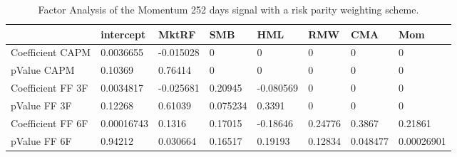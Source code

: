 \begin{table}[H]
\centering
\begin{tabular}{llllllll}
& intercept & MktRF & SMB & HML & RMW & CMA & Mom \\ 
\hline 
Coefficient CAPM & 0.0036655 & -0.015028 & 0 & 0 & 0 & 0 & 0 \\ 
pValue CAPM & 0.10369 & 0.76414 & 0 & 0 & 0 & 0 & 0 \\ 
Coefficient FF 3F & 0.0034817 & -0.025681 & 0.20945 & -0.080569 & 0 & 0 & 0 \\ 
pValue FF 3F & 0.12268 & 0.61039 & 0.075234 & 0.3391 & 0 & 0 & 0 \\ 
Coefficient FF 6F & 0.00016743 & 0.1316 & 0.17015 & -0.18646 & 0.24776 & 0.3867 & 0.21861 \\ 
pValue FF 6F & 0.94212 & 0.030664 & 0.16517 & 0.19193 & 0.12834 & 0.048477 & 0.00026901 \\ 
\hline
\end{tabular}
\caption{Factor Analysis of the Momentum 252 days signal with a risk parity weighting scheme.}
\label{MOM252RP_FACTOR}
\end{table}